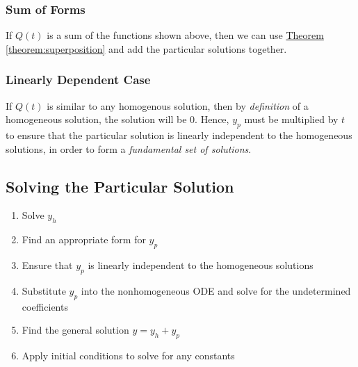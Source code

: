 \documentclass{article}
\begin{document}
\subsubsection{Sum of Forms}
If $Q(t)$ is a sum of the functions shown above, then we can use
\hyperref[theorem:superposition]{Theorem \ref{theorem:superposition}}
and add the particular solutions together.
\subsubsection{Linearly Dependent Case}
If $Q(t)$ is similar to any homogenous solution, then by \textit{definition} of
a homogeneous solution, the solution will be $0$. Hence, $y_p$ must be multiplied by $t$
to ensure that the particular solution is linearly independent to the homogeneous solutions,
in order to form a \textit{fundamental set of solutions}.
\subsection{Solving the Particular Solution}
\begin{enumerate}
    \item Solve $y_h$
    \item Find an appropriate form for $y_p$
    \item Ensure that $y_p$ is linearly independent to the homogeneous solutions
    \item Substitute $y_p$ into the nonhomogeneous ODE and solve for the undetermined coefficients
    \item Find the general solution $y = y_h + y_p$
    \item Apply initial conditions to solve for any constants
\end{enumerate}
\end{document}
